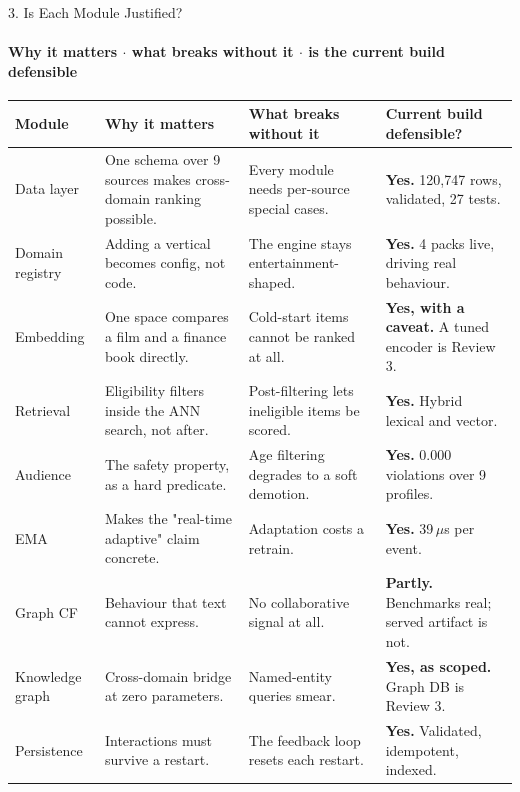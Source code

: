 \documentclass[aspectratio=169, 11pt]{beamer}
\begin{document}
\begin{frame}[shrink]{3. Is Each Module Justified?}
\framesubtitle{Why it matters $\cdot$ what breaks without it $\cdot$ is the current build defensible}
\vspace{1mm}
\begin{center}
{\tiny
\renewcommand{\arraystretch}{1.12}
\begin{tabular}{L{1.45cm} L{3.05cm} L{2.85cm} L{3.35cm}}
\toprule
\textbf{Module} & \textbf{Why it matters} & \textbf{What breaks without it} & \textbf{Current build defensible?}\\
\midrule
Data layer      & One schema over 9 sources makes cross-domain ranking possible.   & Every module needs per-source special cases.     & \textbf{Yes.} 120{,}747 rows, validated, 27 tests.\\
Domain registry & Adding a vertical becomes config, not code.                      & The engine stays entertainment-shaped.           & \textbf{Yes.} 4 packs live, driving real behaviour.\\
Embedding       & One space compares a film and a finance book directly.           & Cold-start items cannot be ranked at all.        & \textbf{Yes, with a caveat.} A tuned encoder is Review 3.\\
Retrieval       & Eligibility filters inside the ANN search, not after.            & Post-filtering lets ineligible items be scored.  & \textbf{Yes.} Hybrid lexical and vector.\\
Audience        & The safety property, as a hard predicate.                        & Age filtering degrades to a soft demotion.       & \textbf{Yes.} 0.000 violations over 9 profiles.\\
EMA             & Makes the "real-time adaptive" claim concrete.                   & Adaptation costs a retrain.                      & \textbf{Yes.} 39\,$\mu$s per event.\\
Graph CF        & Behaviour that text cannot express.                              & No collaborative signal at all.                  & \textbf{Partly.} Benchmarks real; served artifact is not.\\
Knowledge graph & Cross-domain bridge at zero parameters.                          & Named-entity queries smear.                      & \textbf{Yes, as scoped.} Graph DB is Review 3.\\
Persistence     & Interactions must survive a restart.                             & The feedback loop resets each restart.           & \textbf{Yes.} Validated, idempotent, indexed.\\

\end{tabular}}
\end{center}
\end{frame}
\end{document}

